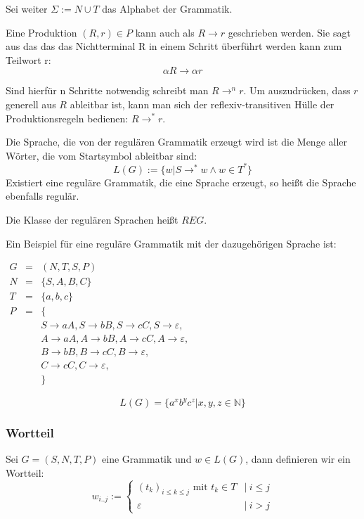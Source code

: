 \documentclass[a4paper,12pt]{report}
\begin{document}
Sei weiter $\Sigma := N \cup T$ das Alphabet der Grammatik.

Eine Produktion $(R,r)\in P$ kann auch als $R\rightarrow r$ geschrieben werden.
Sie sagt aus das das das Nichtterminal R in einem Schritt überführt werden kann zum Teilwort r:
\[ \alpha R \rightarrow \alpha r \]

Sind hierfür n Schritte notwendig schreibt man
$R \rightarrow^n r$. Um auszudrücken, dass $r$ generell aus $R$ ableitbar ist, kann man sich der reflexiv-transitiven Hülle der Produktionsregeln bedienen: $R \rightarrow ^* r$.

Die Sprache, die von der regulären Grammatik erzeugt wird ist die Menge aller Wörter, die vom Startsymbol ableitbar sind: 
\[ L(G) := \{w | S \rightarrow^* w \land w\in T^* \} \]
Existiert eine reguläre Grammatik, die eine Sprache erzeugt, so heißt die Sprache ebenfalls regulär.

Die Klasse der regulären Sprachen heißt $REG$.

Ein Beispiel für eine reguläre Grammatik mit der dazugehörigen Sprache ist: 

\begin{center}
 $
\begin{array}{rcl}
  G &=& (N,T,S,P) \\
  N &=& \{ S, A, B, C \} \\
  T &=& \{ a, b, c \} \\
  P &=& \{ \\ 
  &&  S \rightarrow a A,
    S \rightarrow b B,
    S \rightarrow c C,
    S \rightarrow \varepsilon,\\
  &&  A \rightarrow a A,
    A \rightarrow b B,
    A \rightarrow c C,
    A \rightarrow \varepsilon,\\
  &&  B \rightarrow b B,
    B \rightarrow c C,
    B \rightarrow \varepsilon, \\
  &&  C \rightarrow c C,
    C \rightarrow \varepsilon,\\
  &&\}
\end{array}
$ 
\end{center}

\[ L(G) = \{ a^xb^yc^z | x,y,z\in \mathbb{N} \} \] 




\subsubsection*{Wortteil}

Sei $G=(S,N,T,P)$ eine Grammatik und $w\in L(G)$, dann definieren wir ein Wortteil: 
\[ 
w_{i..j} := 
\begin{cases}
  (t_k)_{i\leq k \leq j}\text{ mit }t_k\in T &|\ i\leq j \\
  \varepsilon &|\ i>j
\end{cases}
\] 
\end{document}
